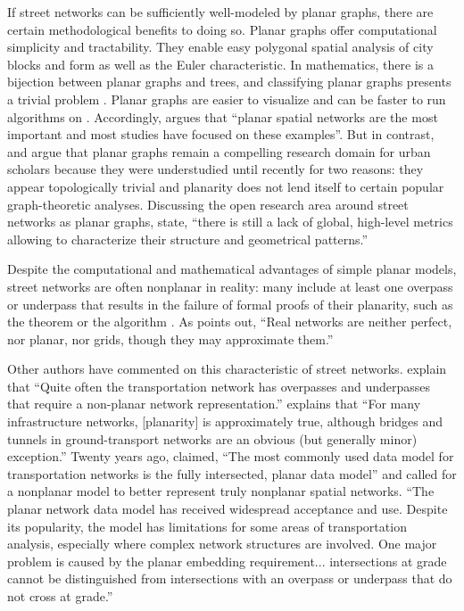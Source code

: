 \documentclass[Afour,sageh,times]{sagej}
\begin{document}
If street networks can be sufficiently well-modeled by planar graphs, there are certain methodological benefits to doing so. Planar graphs offer computational simplicity and tractability. They enable easy polygonal spatial analysis of city blocks and form \citep{fohl_non-planar_1996} as well as the Euler characteristic. In mathematics, there is a bijection between planar graphs and trees, and classifying planar graphs presents a trivial problem \citep{louf_typology_2014}. Planar graphs are easier to visualize and can be faster to run algorithms on \citep{liebers_planarizing_2001}. Accordingly, \citet[p.~3]{barthelemy_spatial_2011} argues that \enquote{planar spatial networks are the most important and most studies have focused on these examples}. But in contrast, \citet{masucci_random_2009} and \citet{masucci_limited_2013} argue that planar graphs remain a compelling research domain for urban scholars because they were understudied until recently for two reasons: they appear topologically trivial and planarity does not lend itself to certain popular graph-theoretic analyses. Discussing the open research area around street networks as planar graphs, \citet[p.~1]{viana_simplicity_2013} state, \enquote{there is still a lack of global, high-level metrics allowing to characterize their structure and geometrical patterns.}

Despite the computational and mathematical advantages of simple planar models, street networks are often nonplanar in reality: many include at least one overpass or underpass that results in the failure of formal proofs of their planarity, such as the \citet{kuratowski_sur_1930} theorem or the \cite{hopcroft_efficient_1974} algorithm \citep[cf.][]{gastner_spatial_2006}. As \citet[p.~7]{levinson_network_2012} points out, \enquote{Real networks are neither perfect, nor planar, nor grids, though they may approximate them.}

Other authors have commented on this characteristic of street networks. \citet[p.~199]{jiang_object-oriented_2010} explain that \enquote{Quite often the transportation network has overpasses and underpasses that require a non-planar network representation.} \citet[p.~1258]{fischer_spatial_2014} explains that \enquote{For many infrastructure networks, {[planarity]} is approximately true, although bridges and tunnels in ground-transport networks are an obvious (but generally minor) exception.} Twenty years ago, \citep[p.~18]{fohl_non-planar_1996} claimed, \enquote{The most commonly used data model for transportation networks is the fully intersected, planar data model} and called for a nonplanar model to better represent truly nonplanar spatial networks. \enquote{The planar network data model has received widespread acceptance and use. Despite its popularity, the model has limitations for some areas of transportation analysis, especially where complex network structures are involved. One major problem is caused by the planar embedding requirement... intersections at grade cannot be distinguished from intersections with an overpass or underpass that do not cross at grade.} \citep[p.~395]{fischer_gis_2004} 
\end{document}

